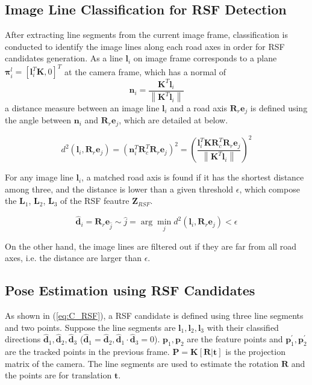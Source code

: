 \documentclass[letterpaper, 10 pt, conference]{ieeeconf}  %
\begin{document}
\subsection{Image Line Classification for RSF Detection}

After extracting line segments from the current image frame, classification is conducted to identify the image lines along each road axes in order for RSF candidates generation.
As a line $\mathbf{l}_i$ on image frame corresponds to a plane $\mathbf{\pi}_i^l = \left[\mathbf{l}_i^T\mathbf{K}, 0\right]^T$ at the camera frame, which has a normal of
\begin{equation}
\mathbf{n}_i=\frac{\mathbf{K}^T\mathbf{l}_i}{\left\|\mathbf{K}^T\mathbf{l}_i\right\|}
\end{equation}
a distance measure between an image line $\mathbf{l}_i$ and a road axis $\mathbf{R}_r\mathbf{e}_j$ is defined using the angle between $\mathbf{n}_i$ and $\mathbf{R}_r\mathbf{e}_j$, which are detailed at below.

\begin{equation}
d^2(\mathbf{l}_i,\mathbf{R}_r\mathbf{e}_j) = {\left(\mathbf{n}_i^T\mathbf{R}_c^T\mathbf{R}_r\mathbf{e}_j\right)}^2 = { \left(\frac  {\mathbf{l}_i^T\mathbf{K}\mathbf{R}_c^T\mathbf{R}_r\mathbf{e}_j}
                {\left\|\mathbf{K}^T\mathbf{l}_i\right\|}
    \right)
  }^2
\label{eq:d_3d}
\end{equation}

For any image line $\mathbf{l}_i$, a matched road axis is found if it has the shortest distance among three, and the distance is lower than a given threshold $\epsilon$, which compose the $\mathbf{L}_1$, $\mathbf{L}_2$, $\mathbf{L}_3$ of the RSF feautre $\mathbf{Z}_{RSF}$.

\begin{equation}
\hat{\mathbf{d}}_i = \mathbf{R}_r\mathbf{e}_{\hat{j}} \sim \hat{j} = \arg\min _{j} d^2(\mathbf{l}_i,\mathbf{R}_r\mathbf{e}_j)<\epsilon
\end{equation}

On the other hand, the image lines are filtered out if they are far from all road axes, i.e. the distance are larger than $\epsilon$.

\subsection{Pose Estimation using RSF Candidates}
As shown in (\ref{eq:C_RSF}), a RSF candidate is defined using three line segments and two points. Suppose the line segments are $\mathbf{l}_1,\mathbf{l}_2,\mathbf{l}_3$ with their classified directions $\hat{\mathbf{d}}_1,\hat{\mathbf{d}}_2,\hat{\mathbf{d}}_3$ ($\hat{\mathbf{d}}_1=\hat{\mathbf{d}}_2,\hat{\mathbf{d}}_1\cdot\hat{\mathbf{d}}_3=0$). $\mathbf{p}_1, \mathbf{p}_2$ are the feature points and $\mathbf{p}_1^\prime, \mathbf{p}_2^\prime$ are the tracked points in the previous frame. $\mathbf{P}=\mathbf{K}[\mathbf{R}|\mathbf{t}]$ is the projection matrix of the camera.
The line segments are used to estimate the rotation $\mathbf{R}$ and the points are for translation $\mathbf{t}$.
\end{document}
